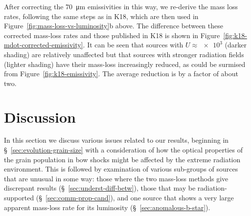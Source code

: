 After correcting the \SI{70}{\um} emissivities in this way, we
re-derive the mass loss rates, following the same steps as in K18,
which are then used in Figure~\ref{fig:mass-loss-vs-luminosity}b
above.  The difference between these corrected mass-loss rates and
those published in K18 is shown in
Figure~\ref{fig:k18-mdot-corrected-emissivity}.  It can be seen that
sources with \(U \approx \num{e3}\) (darker shading) are relatively
unaffected but that sources with stronger radiation fields (lighter
shading) have their mass-loss increasingly reduced, as could be
surmised from Figure~\ref{fig:k18-emissivity}.  The average reduction
is by a factor of about two.









\section{Discussion}
\label{sec:discussion}

In this section we discuss various issues related to our results,
beginning in \S~\ref{sec:evolution-grain-size} with a consideration of
how the optical properties of the grain population in bow shocks might
be affected by the extreme radiation environment.  This is followed by
examination of various sub-groups of sources that are unusual in some
way: those where the two mass-loss methods give discrepant results
(\S~\ref{sec:underst-diff-betw}), those that may be
radiation-supported (\S~\ref{sec:comm-prop-cand}), and one source that
shows a very large apparent mass-loss rate for its luminosity
(\S~\ref{sec:anomalous-b-star}).

